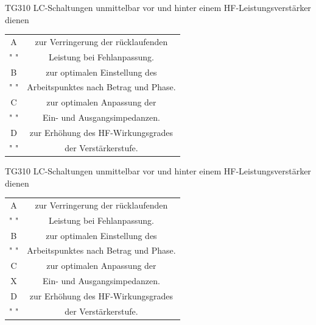 \begin{frame}
    \begin{center} \Large
        \begin{block}{TG310}
		\large  LC-Schaltungen unmittelbar vor und hinter einem HF-Leistungsverstärker dienen\\
    	\end{block}
        \begin{tabular}{|c|c|}
        \hline
        A & zur Verringerung der rücklaufenden \\ 	
        " " & Leistung bei Fehlanpassung. \\ \hline
        B & zur optimalen Einstellung des \\ 
        " " & Arbeitspunktes nach Betrag und Phase. \\ \hline
        C & zur optimalen Anpassung der \\
        " " & Ein- und Ausgangsimpedanzen.\\ \hline
        D & zur Erhöhung des HF-Wirkungsgrades \\
        " " & der Verstärkerstufe.\\ \hline
        \end{tabular}
    \end{center}
\end{frame}
\begin{frame}
    \begin{center} \Large
        \begin{block}{TG310}
		\large  LC-Schaltungen unmittelbar vor und hinter einem HF-Leistungsverstärker dienen\\
    	\end{block}
        \begin{tabular}{|c|c|}
        \hline
        A & zur Verringerung der rücklaufenden \\ 	
        " " & Leistung bei Fehlanpassung. \\ \hline
        B & zur optimalen Einstellung des \\ 
        " " & Arbeitspunktes nach Betrag und Phase. \\ \hline
        C & zur optimalen Anpassung der \\
        X & Ein- und Ausgangsimpedanzen.\\ \hline
        D & zur Erhöhung des HF-Wirkungsgrades \\
        " " & der Verstärkerstufe.\\ \hline
        \end{tabular}
    \end{center}
\end{frame}

